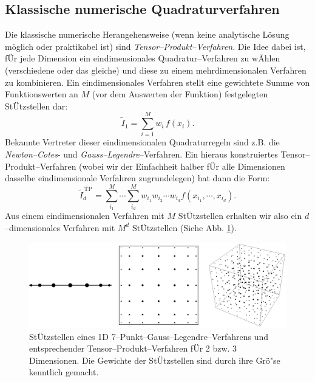 	\subsection{Klassische numerische Quadraturverfahren}
	Die klassische numerische Herangehensweise (wenn keine analytische Lösung möglich oder praktikabel ist) sind {\em Tensor--Produkt--Verfahren}. Die Idee dabei ist, fÜr jede Dimension ein eindimensionales Quadratur--Verfahren zu wÄhlen (verschiedene oder das gleiche) und diese zu einem mehrdimensionalen Verfahren zu kombinieren. Ein eindimensionales Verfahren stellt eine gewichtete Summe von Funktionswerten an $M$ (vor dem Auswerten der Funktion) festgelegten StÜtzstellen dar:
	$${\tilde I}_1=\sum_{i=1}^M w_i\,f(x_i).$$
	Bekannte Vertreter dieser eindimensionalen Quadraturregeln sind z.B. die {\em Newton--Cotes}- und {\em Gauss--Legendre}--Verfahren. Ein hieraus konstruiertes Tensor--Produkt--Verfahren (wobei wir der Einfachheit halber fÜr alle Dimensionen dasselbe eindimensionale Verfahren zugrundelegen) hat dann die Form:
	$${\tilde I}_d^{\,\text{TP}}=\sum_{i_1}^M\cdots\sum_{i_d}^M w_{i_1}w_{i_2}\cdots w_{i_d}f(x_{i_1},\cdots,x_{i_d}).$$
	Aus einem eindimensionalen Verfahren mit $M$ StÜtzstellen erhalten wir also ein $d$--dimensionales Verfahren mit $M^d$ StÜtzstellen (Siehe Abb. {\ref{fig:tensorproduct}}).
	\begin{figure}
		\centering
		\includegraphics[height=0.25\textheight]{tensorproduct_quadrature.eps}
		\caption{StÜtzstellen eines 1D 7--Punkt--Gauss--Legendre--Verfahrens und entsprechender Tensor--Produkt--Verfahren fÜr 2 bzw. 3 Dimensionen. Die Gewichte der StÜtzstellen sind durch ihre Grö"se kenntlich gemacht.}
		\label{fig:tensorproduct}
	\end{figure}
	
